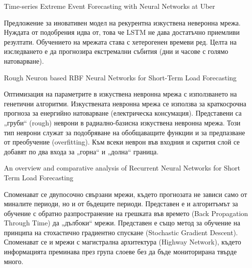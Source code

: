 ﻿Time-series Extreme Event Forecasting with Neural Networks at Uber

Предложение за иновативен модел на рекурентна изкуствена неверонна мрежа. Нуждата от подобрения идва от, това че LSTM не дава достатъчно приемливи резултати. Обучението на мрежата става с хетерогенен времеви ред. Целта на изследването е да прогнозира екстремални събития (дни и часове с голямо натоварване). 

Rough Neuron based RBF Neural Networks for Short-Term Load Forecasting

Оптимизация на параметрите в изкуствена невронна мрежа с използването на генетични алгоритми. Изкуствената невронна мрежа се използва за краткосрочна прогноза за енергийно натоварване (електрическа консумация). Представени са „груби“ (rough) неврони в радиално-базисна изкуствена невронна мрежа. Този тип неврони служат за подобряване на обобщаващите функции и за предпазване от преобучение (overfitting). Към всеки неврон във входния и скрития слой се добавят по два входа за „горна“ и „долна“ граница. 

An overview and comparative analysis of Recurrent Neural Networks for Short Term Load Forecasting

Споменават се двупосочно свързани мрежи, където прогнозата не зависи само от миналите периоди, но и от бъдещите периоди. Представен е и алгоритъмът за обучение с обратно разпространение на грешката във времето (Back Propagation Through Time) да „дълбоки“ мрежи. Представен е също метод за обучение на принципа на стохастично градиентно спускане (Stochastic Gradient Descent). Споменават се и мрежи с магистрална архитектура (Highway
Network), където информацията преминава през група слоеве без да бъде мониторирана твърде много. 
